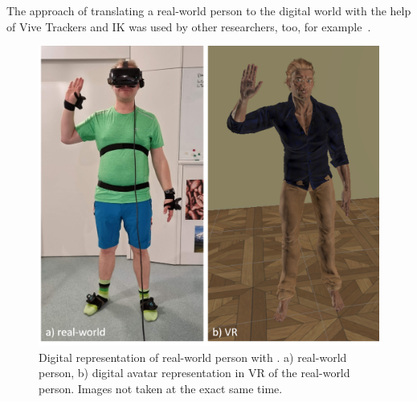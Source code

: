The approach of translating a real-world person to the digital world with the help of Vive Trackers and IK was used by other researchers, too, for example~\cite{samesetup,perspectivematters}. 

\begin{figure}[H]
	\centering
	\includegraphics[width=\textwidth]{figures/selfPerception.png}	
	\caption[Digital representation of real-world person.]{Digital representation of real-world person with \exgo. a) real-world person, b) digital avatar representation in VR of the real-world person. Images not taken at the exact same time.}
	\label{fig:selfPerception}
\end{figure}

